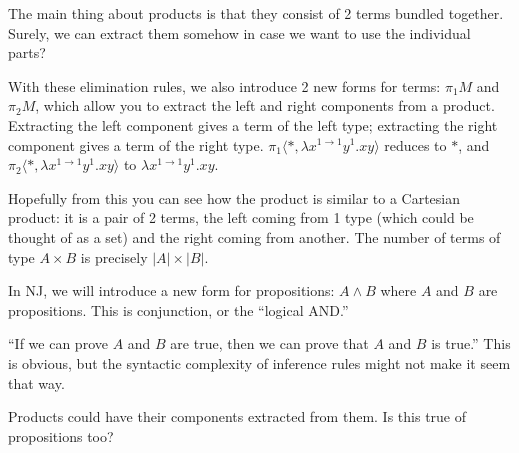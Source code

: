 \documentclass[12pt]{article}
\begin{document}
The main thing about products is that they consist of 2 terms bundled together. Surely, we can extract them somehow in case we want to use the individual parts?

\begin{prooftree}
\end{prooftree}

\begin{prooftree}
\end{prooftree}

With these elimination rules, we also introduce 2 new forms for terms: $\pi_1 M$ and $\pi_2 M$, which allow you to extract the left and right components from a product. Extracting the left component gives a term of the left type; extracting the right component gives a term of the right type. $\pi_1 \langle *, \lambda x^{1 \to 1} y^{1}.xy \rangle$ reduces to $*$, and $\pi_2 \langle *, \lambda x^{1 \to 1} y^{1}.xy \rangle$ to $\lambda x^{1 \to 1} y^{1}.xy$.

Hopefully from this you can see how the product is similar to a Cartesian product: it is a pair of 2 terms, the left coming from 1 type (which could be thought of as a set) and the right coming from another. The number of terms of type $A \times B$ is precisely $|A| \times |B|$.

In NJ, we will introduce a new form for propositions: $A \land B$ where $A$ and $B$ are propositions. This is conjunction, or the ``logical AND.''

\begin{prooftree}
\end{prooftree}

``If we can prove $A$ and $B$ are true, then we can prove that $A$ and $B$ is true.'' This is obvious, but the syntactic complexity of inference rules might not make it seem that way.

Products could have their components extracted from them. Is this true of propositions too?

\begin{prooftree}
\end{prooftree}
\end{document}
